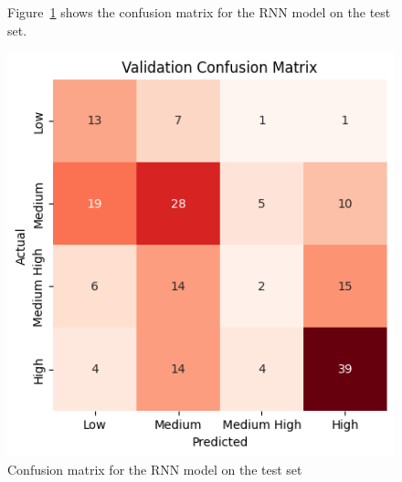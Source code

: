 \begin{figure}[H]
    \centering
    \begin{minipage}{0.6\textwidth}
        Figure~\ref{fig:cm_rnn} shows the confusion matrix for the RNN
        model on the test set.
    \end{minipage}
    \hfill
    \begin{minipage}{0.35\textwidth}
        \includegraphics[width=1\textwidth]{plotsss/rnn_cm.png}
        \caption{Confusion matrix for the RNN model on the test set}
        \label{fig:cm_rnn}
    \end{minipage}
\end{figure}